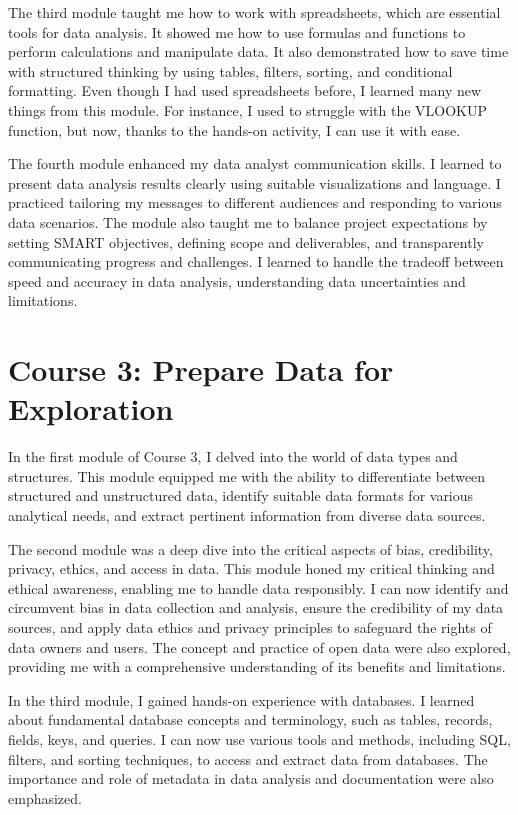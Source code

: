 \documentclass[]{article}
\begin{document}
The third module taught me how to work with spreadsheets, which are essential tools for data analysis. It showed me how to use formulas and functions to perform calculations and manipulate data. It also demonstrated how to save time with structured thinking by using tables, filters, sorting, and conditional formatting. Even though I had used spreadsheets before, I learned many new things from this module. For instance, I used to struggle with the VLOOKUP function, but now, thanks to the hands-on activity, I can use it with ease.

The fourth module enhanced my data analyst communication skills. I learned to present data analysis results clearly using suitable visualizations and language. I practiced tailoring my messages to different audiences and responding to various data scenarios. The module also taught me to balance project expectations by setting SMART objectives, defining scope and deliverables, and transparently communicating progress and challenges. I learned to handle the tradeoff between speed and accuracy in data analysis, understanding data uncertainties and limitations.

\section{Course 3: Prepare Data for Exploration}

In the first module of Course 3, I delved into the world of data types and structures. This module equipped me with the ability to differentiate between structured and unstructured data, identify suitable data formats for various analytical needs, and extract pertinent information from diverse data sources.

The second module was a deep dive into the critical aspects of bias, credibility, privacy, ethics, and access in data. This module honed my critical thinking and ethical awareness, enabling me to handle data responsibly. I can now identify and circumvent bias in data collection and analysis, ensure the credibility of my data sources, and apply data ethics and privacy principles to safeguard the rights of data owners and users. The concept and practice of open data were also explored, providing me with a comprehensive understanding of its benefits and limitations.

In the third module, I gained hands-on experience with databases. I learned about fundamental database concepts and terminology, such as tables, records, fields, keys, and queries. I can now use various tools and methods, including SQL, filters, and sorting techniques, to access and extract data from databases. The importance and role of metadata in data analysis and documentation were also emphasized.
\end{document}
